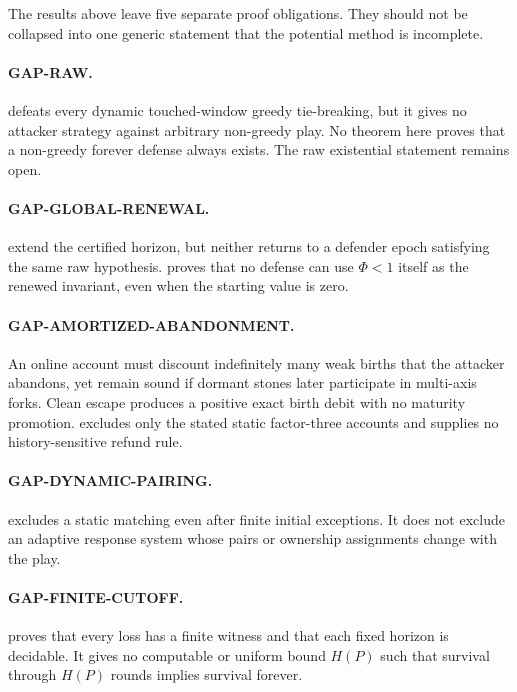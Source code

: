 The results above leave five separate proof obligations.  They should not be
collapsed into one generic statement that the potential method is incomplete.

\paragraph{GAP-RAW.}
 defeats every dynamic touched-window greedy
tie-breaking, but it gives no attacker strategy against arbitrary non-greedy
play.  No theorem here proves that a non-greedy forever defense always exists.
The raw existential statement remains open.

\paragraph{GAP-GLOBAL-RENEWAL.}
 extend the certified horizon,
but neither returns to a defender epoch satisfying the same raw hypothesis.
 proves that no defense can use $\Phi<1$ itself as
the renewed invariant, even when the starting value is zero.

\paragraph{GAP-AMORTIZED-ABANDONMENT.}
An online account must discount indefinitely many weak births that the
attacker abandons, yet remain sound if dormant stones later participate in
multi-axis forks.  Clean escape produces a positive exact birth debit with no
maturity promotion.   excludes only the stated
static factor-three accounts and supplies no history-sensitive refund rule.

\paragraph{GAP-DYNAMIC-PAIRING.}
 excludes a static matching even after finite
initial exceptions.  It does not exclude an adaptive response system whose
pairs or ownership assignments change with the play.

\paragraph{GAP-FINITE-CUTOFF.}
 proves that every loss has a finite witness and
that each fixed horizon is decidable.  It gives no computable or uniform bound
$H(P)$ such that survival through $H(P)$ rounds implies survival forever.

